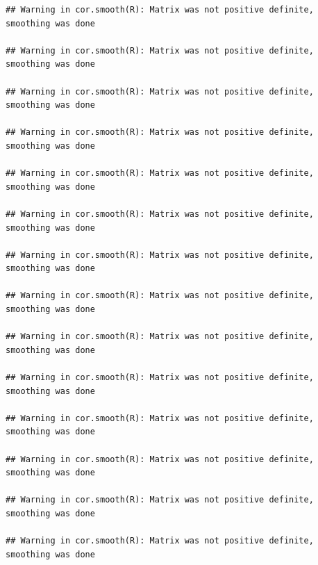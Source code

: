 \documentclass[
  english,
  man,floatsintext]{apa6}
\begin{document}
\begin{verbatim}
## Warning in cor.smooth(R): Matrix was not positive definite, smoothing was done

## Warning in cor.smooth(R): Matrix was not positive definite, smoothing was done

## Warning in cor.smooth(R): Matrix was not positive definite, smoothing was done

## Warning in cor.smooth(R): Matrix was not positive definite, smoothing was done

## Warning in cor.smooth(R): Matrix was not positive definite, smoothing was done

## Warning in cor.smooth(R): Matrix was not positive definite, smoothing was done

## Warning in cor.smooth(R): Matrix was not positive definite, smoothing was done

## Warning in cor.smooth(R): Matrix was not positive definite, smoothing was done

## Warning in cor.smooth(R): Matrix was not positive definite, smoothing was done

## Warning in cor.smooth(R): Matrix was not positive definite, smoothing was done

## Warning in cor.smooth(R): Matrix was not positive definite, smoothing was done

## Warning in cor.smooth(R): Matrix was not positive definite, smoothing was done

## Warning in cor.smooth(R): Matrix was not positive definite, smoothing was done

## Warning in cor.smooth(R): Matrix was not positive definite, smoothing was done
\end{verbatim}
\end{document}
